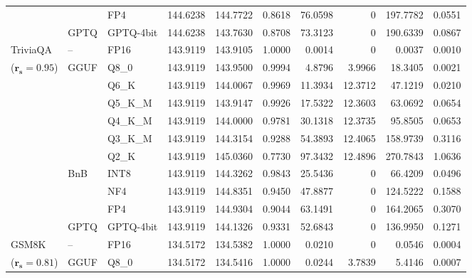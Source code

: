 \begin{longtable}{ll l rrrrrrr}
 &  & FP4 & 144.6238 & 144.7722 & \cellcolor{red!18} 0.8618 & \cellcolor{red!18} 76.0598 & \cellcolor{cyan!12} $0$ & \cellcolor{red!18} 197.7782 & \cellcolor{red!18} 0.0551 \\
 & GPTQ & GPTQ-4bit & 144.6238 & 143.7630 & \cellcolor{red!18} 0.8708 & \cellcolor{red!18} 73.3123 & \cellcolor{cyan!12} $0$ & \cellcolor{red!18} 190.6339 & \cellcolor{red!18} 0.0867 \\
\midrule
TriviaQA & -- & FP16 & 143.9119 & 143.9105 & 1.0000 & 0.0014 & \cellcolor{cyan!12} $0$ & 0.0037 & 0.0010 \\
{\small ($\mathbf{r_s{=}0.95}$)} & GGUF & Q8\_0 & 143.9119 & 143.9500 & 0.9994 & 4.8796 & 3.9966 & 18.3405 & 0.0021 \\
 &  & Q6\_K & 143.9119 & 144.0067 & 0.9969 & 11.3934 & 12.3712 & 47.1219 & 0.0210 \\
 &  & Q5\_K\_M & 143.9119 & 143.9147 & 0.9926 & 17.5322 & 12.3603 & 63.0692 & 0.0654 \\
 &  & Q4\_K\_M & 143.9119 & 144.0000 & 0.9781 & 30.1318 & 12.3735 & 95.8505 & 0.0653 \\
 &  & Q3\_K\_M & 143.9119 & 144.3154 & \cellcolor{red!18} 0.9288 & \cellcolor{red!18} 54.3893 & 12.4065 & \cellcolor{red!18} 158.9739 & \cellcolor{red!18} 0.3116 \\
 &  & Q2\_K & 143.9119 & 145.0360 & \cellcolor{red!35} 0.7730 & \cellcolor{red!35} 97.3432 & 12.4896 & \cellcolor{red!35} 270.7843 & \cellcolor{red!35} 1.0636 \\
 & BnB & INT8 & 143.9119 & 144.3262 & 0.9843 & 25.5436 & \cellcolor{cyan!12} $0$ & 66.4209 & 0.0496 \\
 &  & NF4 & 143.9119 & 144.8351 & \cellcolor{red!18} 0.9450 & \cellcolor{red!18} 47.8877 & \cellcolor{cyan!12} $0$ & \cellcolor{red!18} 124.5222 & \cellcolor{red!18} 0.1588 \\
 &  & FP4 & 143.9119 & 144.9304 & \cellcolor{red!18} 0.9044 & \cellcolor{red!18} 63.1491 & \cellcolor{cyan!12} $0$ & \cellcolor{red!18} 164.2065 & \cellcolor{red!18} 0.3070 \\
 & GPTQ & GPTQ-4bit & 143.9119 & 144.1326 & \cellcolor{red!18} 0.9331 & \cellcolor{red!18} 52.6843 & \cellcolor{cyan!12} $0$ & \cellcolor{red!18} 136.9950 & \cellcolor{red!18} 0.1271 \\
\midrule
GSM8K & -- & FP16 & 134.5172 & 134.5382 & 1.0000 & 0.0210 & \cellcolor{cyan!12} $0$ & 0.0546 & 0.0004 \\
{\small ($\mathbf{r_s{=}0.81}$)} & GGUF & Q8\_0 & 134.5172 & 134.5416 & 1.0000 & 0.0244 & 3.7839 & 5.4146 & 0.0007 \\

\end{longtable}
